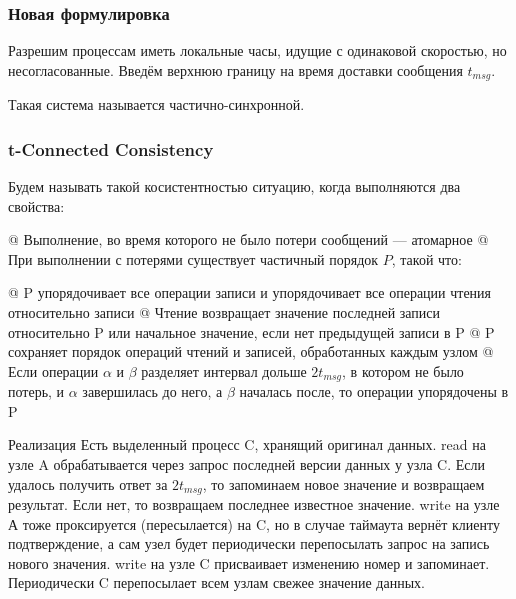 \begin{tconncons}
\subsubsection{Новая формулировка}
Разрешим процессам иметь локальные часы, идущие с одинаковой скоростью, но несогласованные. Введём верхнюю границу на время доставки сообщения $t_{msg}$.

Такая система называется частично-синхронной.


\subsubsection{t-Connected Consistency}
Будем называть такой косистентностью ситуацию, когда выполняются два свойства:
\begin{el}[ul]
@ Выполнение, во время которого не было потери сообщений --- атомарное
@ При выполнении с потерями существует частичный порядок $P$, такой что:
\begin{el}[ol]
@ P упорядочивает все операции записи и упорядочивает все операции чтения относительно записи
@ Чтение возвращает значение последней записи относительно P или начальное значение, если нет предыдущей записи в P
@ P сохраняет порядок операций чтений и записей, обработанных каждым узлом
@ Если операции $\alpha$ и $\beta$ разделяет интервал дольше $2 t_{msg}$, в котором не было потерь, и $\alpha$ завершилась до него, а $\beta$ началась после, то операции упорядочены в P
\end{el}
\end{el}


Реализация
Есть выделенный процесс C, хранящий оригинал данных.
read на узле A обрабатывается через запрос последней версии данных у узла C. Если удалось получить ответ за $2 t_{msg}$, то запоминаем новое значение и возвращаем результат. Если нет, то возвращаем последнее известное значение.
write на узле А тоже проксируется (пересылается) на C, но в случае таймаута вернёт клиенту подтверждение, а сам узел будет периодически перепосылать запрос на запись нового значения.
write на узле C присваивает изменению номер и запоминает.
Периодически C перепосылает всем узлам свежее значение данных.


\end{tconncons}
